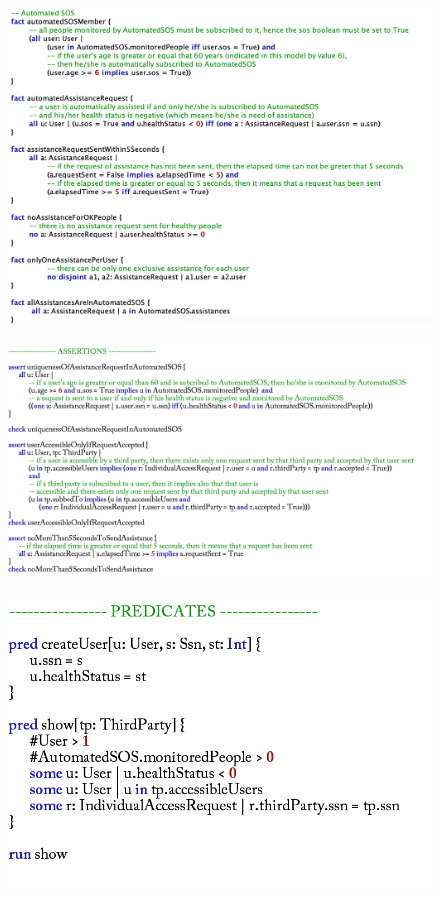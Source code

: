 \documentclass[12pt,a4paper]{article}
\begin{document}
				\begin{figure}[H]
				\centering
				\includegraphics[width=1.3\linewidth]{Images/facts2}
				\label{fig:facts2}
			\end{figure}
			\begin{figure}[H]
				\centering
				\includegraphics[width=1.3\linewidth]{Images/assertions}
				\label{fig:assertions}
			\end{figure}
			\begin{figure}[H]
				\centering
				\includegraphics[width=0.7\linewidth]{Images/predicates}
				\label{fig:predicates}
			\end{figure}
\end{document}
